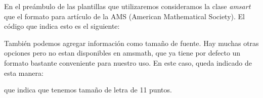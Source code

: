 \documentclass[graybox,envcountchap,sectrefs]{svmono}
\begin{document}
    En el preámbulo de las plantillas que utilizaremos
    consideramos la clase \emph{amsart} que el formato para artículo de la AMS (American Mathematical Society).
    El código que indica esto es el siguiente:
        También podemos agregar información como tamaño de fuente. Hay muchas otras opciones pero no estan disponibles en amsmath,
        que ya tiene por defecto un formato bastante conveniente para nuestro uso.
        En este caso, queda indicado de esta manera:
        que indica que tenemos tamaño de letra de 11 puntos.
\end{document}
